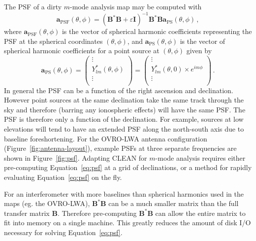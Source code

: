 \documentclass[twocolumn]{aastex61}
\renewcommand{\b}{\pmb}
\begin{document}
The PSF of a dirty $m$-mode analysis map may be computed with
\begin{equation}\label{eq:psf}
    \b a_\text{PSF}(\theta, \phi)
        = (\b B^*\b B + \varepsilon\b I)^{-1}\b B^*\b B\b a_\text{PS}(\theta, \phi)\,,
\end{equation}
where $\b a_\text{PSF}(\theta, \phi)$ is the vector of spherical harmonic coefficients representing
the PSF at the spherical coordinates $(\theta, \phi)$, and $\b a_\text{PS}(\theta, \phi)$ is the
vector of spherical harmonic coefficients for a point source at $(\theta, \phi)$ given by
\begin{equation}
    \b a_\text{PS}(\theta, \phi) = \begin{pmatrix}
        \vdots \\
        Y_{lm}^*(\theta, \phi) \\
        \vdots \\
    \end{pmatrix}
    = \begin{pmatrix}
        \vdots \\
        Y_{lm}^*(\theta, 0)\times e^{im\phi} \\
        \vdots \\
    \end{pmatrix} \,.
\end{equation}
In general the PSF can be a function of the right ascension and declination. However point sources
at the same declination take the same track through the sky and therefore (barring any ionospheric
effects) will have the same PSF. The PSF is therefore only a function of the declination. For
example, sources at low elevations will tend to have an extended PSF along the north-south axis due
to baseline foreshortening. For the OVRO-LWA antenna configuration
(Figure~\ref{fig:antenna-layout}), example PSFs at three separate frequencies are shown in
Figure~\ref{fig:psf}.  Adapting CLEAN for $m$-mode analysis requires either pre-computing
Equation~\ref{eq:psf} at a grid of declinations, or a method for rapidly evaluating
Equation~\ref{eq:psf} on the fly.


For an interferometer with more baselines than spherical harmonics used in the maps (eg. the
OVRO-LWA), $\b B^*\b B$ can be a much smaller matrix than the full transfer matrix $\b B$. Therefore
pre-computing $\b B^*\b B$ can allow the entire matrix to fit into memory on a single machine. This
greatly reduces the amount of disk I/O necessary for solving Equation~\ref{eq:psf}.
\end{document}

